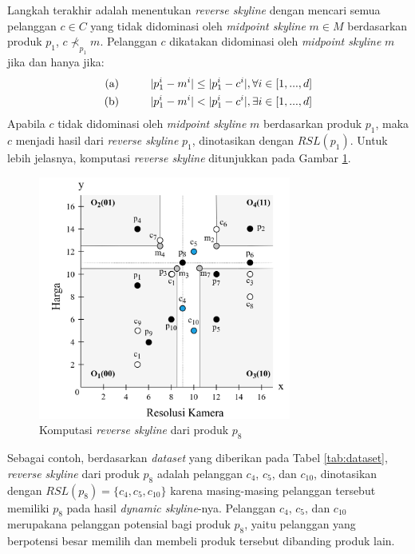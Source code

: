 Langkah terakhir adalah menentukan \textit{reverse skyline} dengan mencari semua pelanggan $c \in C$ yang tidak didominasi oleh \textit{midpoint skyline} $m \in M$ berdasarkan produk $p_1$, $c \nprec_{p_1} m$. Pelanggan $c$ dikatakan didominasi oleh \textit{midpoint skyline} $m$ jika dan hanya jika:
\begin{equation}\label{eq:mid-skyline}
\begin{split}
\text{(a)} \hspace*{1cm} |p_1^i - m^i| \leq |p_1^i - c^i|, \forall i \in [1, ..., d] \\
\text{(b)} \hspace*{1cm} |p_1^i - m^i| < |p_1^i - c^i|, \exists i \in [1, ..., d]
\end{split}
\end{equation}
Apabila $c$ tidak didominasi oleh \textit{midpoint skyline} $m$ berdasarkan produk $p_1$, maka $c$ menjadi hasil dari \textit{reverse skyline} $p_1$, dinotasikan dengan $RSL(p_1)$. Untuk lebih jelasnya, komputasi \textit{reverse skyline} ditunjukkan pada Gambar \ref{fig:rsl}.

\begin{figure}[h]
	\centering
	\includegraphics[height=8cm]{assets/img/bab2/rsl.png}
	\caption{Komputasi \textit{reverse skyline} dari produk $p_8$}
	\label{fig:rsl}
\end{figure}

Sebagai contoh, berdasarkan \textit{dataset} yang diberikan pada Tabel \ref{tab:dataset}, \textit{reverse skyline} dari produk $p_8$ adalah pelanggan $c_4$, $c_5$, dan $c_{10}$, dinotasikan dengan $RSL(p_8) = \{c_4, c_5, c_{10}\}$ karena masing-masing pelanggan tersebut memiliki $p_8$ pada hasil \textit{dynamic skyline}-nya. Pelanggan $c_4$, $c_5$, dan $c_{10}$ merupakana pelanggan potensial bagi produk $p_8$, yaitu pelanggan yang berpotensi besar memilih dan membeli produk tersebut dibanding produk lain.


